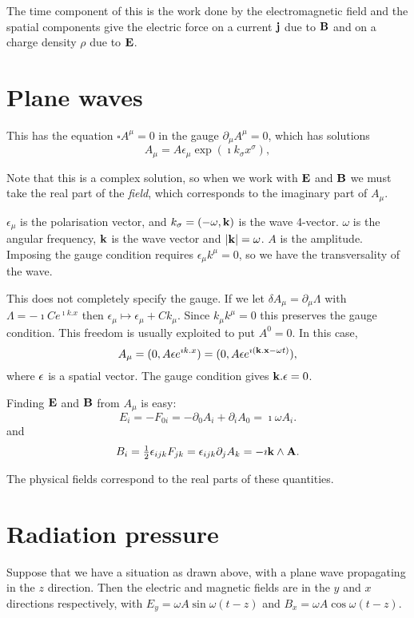 \documentclass{notes}
\newcommand{\B}{\vect{B}}
\newcommand{\E}{\vect{E}}
\newcommand{\jc}{\vect{j}}
\renewcommand{\Box}{\square}
\begin{document}
The time component of this is the work done by the electromagnetic field
and the spatial components give the electric force on a current $\jc$
due to $\B$ and on a charge density $\rho$ due to $\E$.

\section{Plane waves}

This has the equation $\Box A^\mu = 0$ in the gauge $\partial_\mu
A^\mu = 0$, which has solutions
\[
A_\mu = A \epsilon_\mu \exp \left( \imath k_\sigma x^\sigma \right),
\]

Note that this is a complex solution, so when we work with $\E$ and $\B$
we must take the real part of the \emph{field}, which corresponds to the
imaginary part of $A_\mu$.

$\epsilon_\mu$ is the polarisation vector, and $k_\sigma = \left( -\omega,
\mathbf{k}\right)$ is the wave 4-vector.  $\omega$ is the angular frequency,
$\mathbf{k}$ is the wave vector and $\left|\mathbf{k}\right| = \omega$.  $A$ is
the amplitude.  Imposing the gauge condition requires $\epsilon_\mu k^\mu =0$,
so we have the transversality of the wave.

This does not completely specify the gauge.  If we let $\delta A_\mu
= \partial_\mu \Lambda$ with $\Lambda = - \imath C e^{\imath k.x}$ then
$\epsilon_\mu \mapsto \epsilon_\mu + C k_\mu$. Since $k_\mu k^\mu = 0$ this
preserves the gauge condition.  This freedom is usually exploited to put
$A^0 = 0$.  In this case,
\[
A_\mu = (0,A \mathbf{\epsilon} e^{\imath k.x}) = (0,A \mathbf{\epsilon}
e^{\imath ( \mathbf{k}.\mathbf{x} - \omega t )}),
\]
where $\mathbf{\epsilon}$ is a spatial vector.  The gauge condition gives
$\mathbf{k}.\mathbf{\epsilon} = 0$.

Finding $\E$ and $\B$ from $A_\mu$ is easy:
\[
E_i = -F_{0 i} = -\partial_0 A_i + \partial_i A_0
= \imath \omega A_i.
\]
and
\[
B_i = \tfrac{1}{2} \epsilon_{i j k} F_{j k}
= \epsilon_{i j k} \partial_j A_k 
= - \imath \mathbf{k} \wedge \mathbf{A}.
\]

The physical fields correspond to the real parts of these quantities.

\section{Radiation pressure}

\vspace{1in}

Suppose that we have a situation as drawn above, with a plane wave
propagating in the $z$ direction.  Then the electric and
magnetic fields are in the $y$ and $x$ directions respectively, with
$E_y = \omega A \sin \omega (t-z)$ and $B_x = \omega A \cos \omega (t-z)$.
\end{document}
